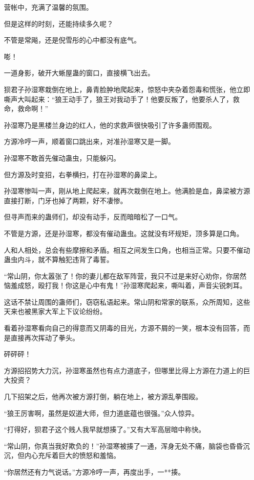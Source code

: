 \begin{this_body}
营帐中，充满了温馨的氛围。

但是这样的时刻，还能持续多久呢？

不管是常飚，还是倪雪彤的心中都没有底气。

嘭！

一道身影，破开大蜥屋蛊的窗口，直接横飞出去。

狈君子孙湿寒栽倒在地上，鼻青脸肿地爬起来，惊怒中夹杂着怨毒和慌张，他立即嘶声大叫起来：“狼王动手了，狼王对我动手了！他要反叛了，他要杀人了，救命，救命啊！”

孙湿寒乃是黑楼兰身边的红人，他的求救声很快吸引了许多蛊师围观。

方源冷哼一声，顺着窗口跳出来，对准孙湿寒又是一脚。

孙湿寒不敢首先催动蛊虫，只能躲闪。

但方源及时变招，右拳横扫，打在孙湿寒的鼻梁上。

孙湿寒惨叫一声，刚从地上爬起来，就再次栽倒在地上。他满脸是血，鼻梁被方源直接打断，门牙也掉了两颗，好不凄惨。

但寻声而来的蛊师们，却没有动手，反而暗暗松了一口气。

不管是方源，还是孙湿寒，都没有催动蛊虫。这就没有坏规矩，顶多算是口角。

人和人相处，总会有些摩擦和矛盾。相互之间发生口角，也相当正常。只要不催动蛊虫内斗，就不算触犯违背了毒誓。

“常山阴，你太嚣张了！你的妻儿都在敌军阵营，我只不过是来好心劝你，你居然恼羞成怒，殴打我！你这是心中有鬼！”孙湿寒爬起来，嘶叫着，声音尖锐刺耳。

这话不禁让周围的蛊师们，窃窃私语起来。常山阴和常家的联系，众所周知，这些天来也被黑家大军上下议论纷纷。

看着孙湿寒看向自己的得意而又阴毒的目光，方源不屑的一笑，根本没有回答，而是直接再次挥动了拳头。

砰砰砰！

方源招招势大力沉，孙湿寒虽然也有点力道底子，但哪里比得上方源在力道上的巨大投资？

几下招架之后，他再次被方源打倒，躺在地上，被方源乱拳围殴。

“狼王厉害啊，虽然是奴道大师，但力道底蕴也很强。”众人惊异。

“打得好，狈君子这个贱人我早就想揍了。”又有大军高层暗中称快。

“常山阴，你真当我好欺负的！”孙湿寒被揍了一通，浑身无处不痛，脑袋也昏昏沉沉，但内心充斥着巨大的愤怒和羞恼。

“你居然还有力气说话。”方源冷哼一声，再度出手，一**揍。


\end{this_body}
